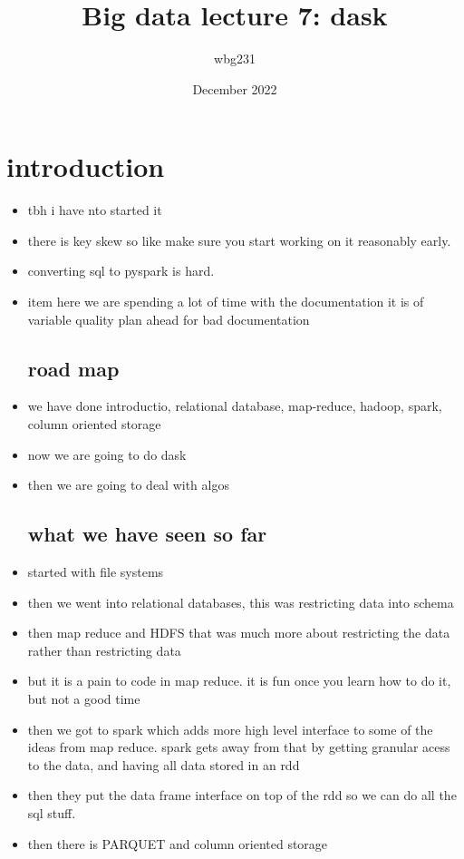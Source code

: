 \documentclass{article}
\title{Big data lecture 7: dask}
\author{wbg231 }
\date{December 2022}
\begin{document}
\maketitle

\section{introduction}
\begin{itemize}
\subsection{how is lab 3 going}
    \item tbh i have nto started it 
    \item there is key skew  so like make sure you start working on it reasonably early. 
    \item converting sql to pyspark is hard. 
    \item item here we are spending a lot of time with the documentation it is of variable quality plan ahead for bad documentation

\subsection{road map}
\item we have done introductio, relational database, map-reduce, hadoop, spark, column oriented storage
\item now we are going to do dask 
\item then we are going to deal with algos
\subsection{what we have seen so far}
\item started with file systems 
\item then we went into relational databases, this was restricting data into schema 
\item then map reduce and HDFS that was much more about restricting the data rather than restricting data 
\item but it is a pain to code in map reduce. it is fun once you learn how to do it, but not a good time 
\item then we got to spark which adds more high level interface to some of the ideas from map reduce. spark gets away from that by getting granular acess to the data, and having all data stored in an rdd
\item then they put the data frame interface on top of the rdd so we can do all the sql stuff.
\item then there is PARQUET and column oriented storage

\end{itemize}
\end{document}
